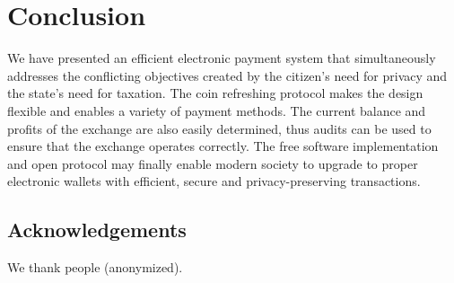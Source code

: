 \documentclass[sigconf, authordraft]{acmart}
\begin{document}
%


\section{Conclusion}

We have presented an efficient electronic payment system that
simultaneously addresses the conflicting objectives created by the
citizen's need for privacy and the state's need for taxation.  The
coin refreshing protocol makes the design flexible and enables a
variety of payment methods.  The current balance and profits of the
exchange are also easily determined, thus audits can be used to ensure
that the exchange operates correctly.  The free software
implementation and open protocol may finally enable modern society to
upgrade to proper electronic wallets with efficient, secure and
privacy-preserving transactions.

\subsection*{Acknowledgements}

We thank people (anonymized).




\end{document}
